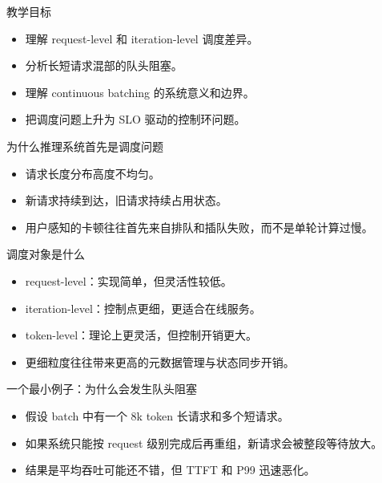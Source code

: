




\begin{frame}[plain]
  \titlepage
\end{frame}

\begin{frame}{教学目标}
  \begin{itemize}
    \item 理解 request-level 和 iteration-level 调度差异。
    \item 分析长短请求混部的队头阻塞。
    \item 理解 continuous batching 的系统意义和边界。
    \item 把调度问题上升为 SLO 驱动的控制环问题。
  \end{itemize}
\end{frame}

\begin{frame}{为什么推理系统首先是调度问题}
  \begin{itemize}
    \item 请求长度分布高度不均匀。
    \item 新请求持续到达，旧请求持续占用状态。
    \item 用户感知的卡顿往往首先来自排队和插队失败，而不是单轮计算过慢。
  \end{itemize}
\end{frame}

\begin{frame}{调度对象是什么}
  \begin{itemize}
    \item request-level：实现简单，但灵活性较低。
    \item iteration-level：控制点更细，更适合在线服务。
    \item token-level：理论上更灵活，但控制开销更大。
    \item 更细粒度往往带来更高的元数据管理与状态同步开销。
  \end{itemize}
\end{frame}

\begin{frame}{一个最小例子：为什么会发生队头阻塞}
  \begin{itemize}
    \item 假设 batch 中有一个 8k token 长请求和多个短请求。
    \item 如果系统只能按 request 级别完成后再重组，新请求会被整段等待放大。
    \item 结果是平均吞吐可能还不错，但 TTFT 和 P99 迅速恶化。
  \end{itemize}
\end{frame}

